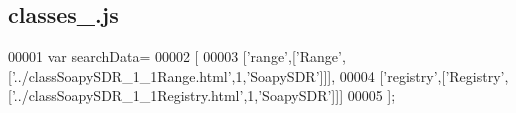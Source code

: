 \subsection{classes\+\_.\+js}
\label{classes__3_8js_source}

\begin{DoxyCode}
00001 var searchData=
00002 [
00003   [\textcolor{stringliteral}{'range'},[\textcolor{stringliteral}{'Range'},[\textcolor{stringliteral}{'../classSoapySDR\_1\_1Range.html'},1,\textcolor{stringliteral}{'SoapySDR'}]]],
00004   [\textcolor{stringliteral}{'registry'},[\textcolor{stringliteral}{'Registry'},[\textcolor{stringliteral}{'../classSoapySDR\_1\_1Registry.html'},1,\textcolor{stringliteral}{'SoapySDR'}]]]
00005 ];
\end{DoxyCode}
